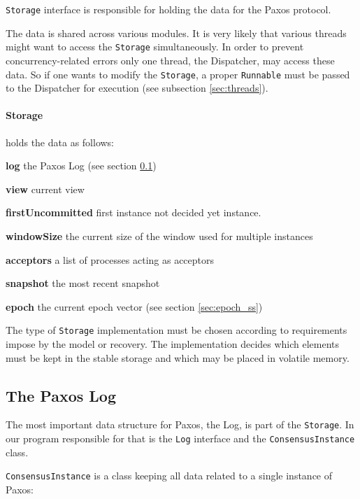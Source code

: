 \texttt{Storage} interface is responsible for holding the data for the Paxos protocol.

The data is shared across various modules.
It is very likely that various threads might want to access the \texttt{Storage} simultaneously. In order to prevent concurrency-related errors only one thread, the Dispatcher, may access these data. So if one wants to modify the \texttt{Storage}, a proper \texttt{Runnable} must be passed to the Dispatcher for execution (see subsection \ref{sec:threads}).

\paragraph{\normalfont \ttfamily Storage}
holds the data as follows:
\begin{tightList}[\setlength{\labelwidth}{0em}]
  \item[\textbf{log}] the Paxos Log (see section \ref{subsec:the_paxos_log})
  \item[\textbf{view}] current view
  \item[\textbf{firstUncommitted}] first instance not decided yet instance.
  \item[\textbf{windowSize}] the current size of the window used for multiple instances
  \item[\textbf{acceptors}] a list of processes acting as acceptors
  \item[\textbf{snapshot}] the most recent snapshot
  \item[\textbf{epoch}] the current epoch vector (see section \ref{sec:epoch_ss})
\end{tightList}

\strut

The type of \texttt{Storage} implementation must be chosen according to requirements impose by the model or recovery.
The implementation decides which elements must be kept in the stable storage and which may be placed in volatile memory.

\subsection{The Paxos Log}
\label{subsec:the_paxos_log}
The most important data structure for Paxos, the Log, is part of the \texttt{Storage}.
In our program responsible for that is the \texttt{Log} interface and the \texttt{Con\-sen\-susInstance} class.

\texttt{ConsensusInstance} is a class keeping all data related to a single instance of Paxos: %

